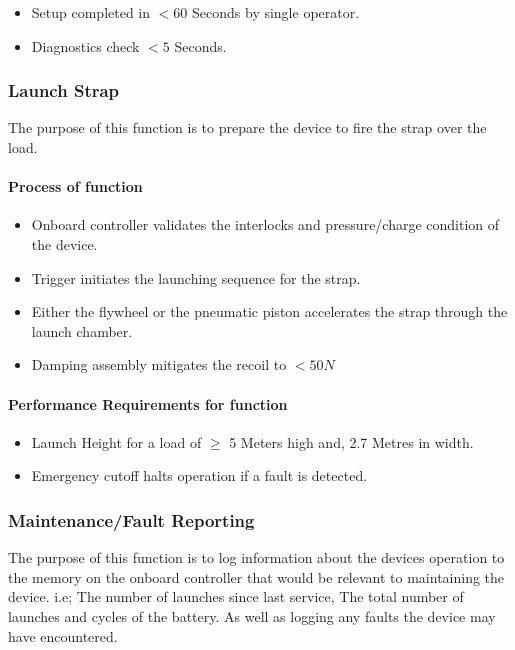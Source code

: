 \documentclass[a4paper,10pt]{article}
\begin{document}
\begin{itemize}
    \item Setup completed in $<60$ Seconds by single operator.
    \item Diagnostics check $<5$ Seconds. 
\end{itemize}


\subsubsection{Launch Strap}

The purpose of this function is to prepare the device to fire the strap over the load. 

\paragraph{Process of function}


\begin{itemize}
    \item Onboard controller validates the interlocks and pressure/charge condition of the device.
    \item Trigger initiates the launching sequence for the strap.
    \item Either the flywheel or the pneumatic piston accelerates the strap through the launch chamber.
    \item Damping assembly mitigates the recoil to $< 50N$
\end{itemize}

\paragraph{Performance Requirements for function}

\begin{itemize}
    \item Launch Height for a load of $\geq$ 5 Meters high and, 2.7 Metres in width.
    \item Emergency cutoff halts operation if a fault is detected.
\end{itemize}

\newpage

\subsubsection{Maintenance/Fault Reporting}

The purpose of this function is to log information about the devices operation to the memory on the onboard controller that would be relevant to maintaining the device. i.e; The number of launches since last service, The total number of launches and cycles of the battery. As well as logging any faults the device may have encountered.
\end{document}
